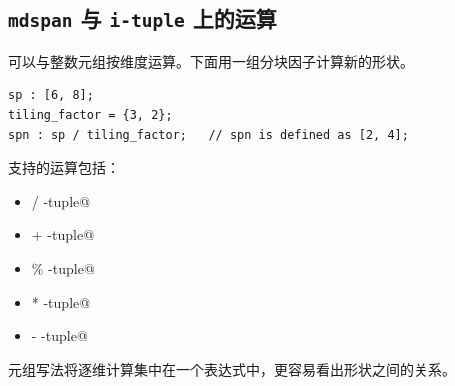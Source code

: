 \subsection*{\texttt{mdspan} 与 \texttt{i-tuple} 上的运算}

\co@mdspan@ 可以与整数元组按维度运算。下面用一组分块因子计算新的形状。

\begin{lstlisting}[language=croqtile,caption={mdspan 与 i-tuple 上的运算}]
sp : [6, 8];
tiling_factor = {3, 2};
spn : sp / tiling_factor;   // spn is defined as [2, 4];
\end{lstlisting}

支持的运算包括：

\begin{itemize}[leftmargin=1.6em]
\item \co@mdspan@ / \co@i-tuple@
\item \co@mdspan@ + \co@i-tuple@
\item \co@mdspan@ \% \co@i-tuple@
\item \co@mdspan@ * \co@i-tuple@
\item \co@mdspan@ - \co@i-tuple@
\end{itemize}

元组写法将逐维计算集中在一个表达式中，更容易看出形状之间的关系。
